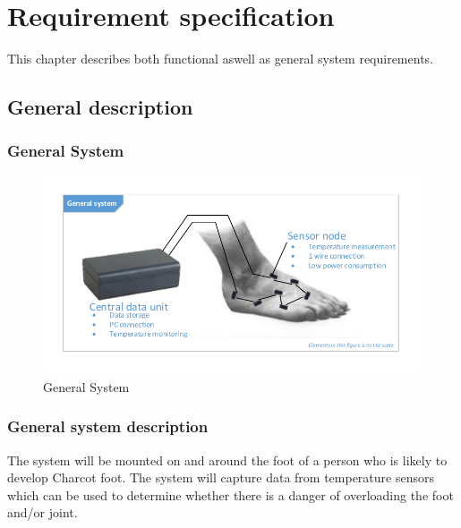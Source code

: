



\chapter{Requirement specification}
This chapter describes both functional aswell as general system requirements.
\section{General description}

\subsection{General System}
\begin{figure}[H]
	\centering
	\includegraphics[width=1\textwidth]{billeder/GeneralSystem}
	\caption{General System}
\end{figure}

\subsection{General system description}
The system will be mounted on and around the foot of a person who is likely to develop Charcot foot. The system will capture data from temperature sensors which can be used to determine whether there is a danger of overloading the foot and/or joint.

